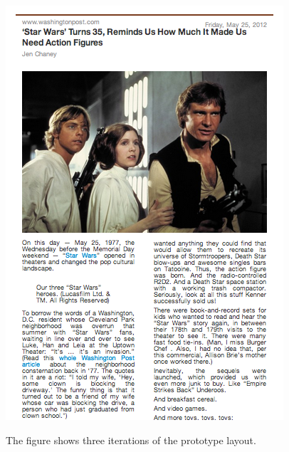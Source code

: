 \begin{figure}
{	{\includegraphics[width=.38\largefigure]{img/prototype-iteration3-2}}%
}
\caption{The figure shows three iterations of the prototype layout.}%
\label{fig:prototype-iterations}%
\end{figure}

